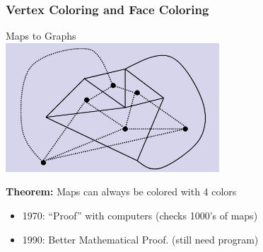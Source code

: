 \documentclass{beamer}
\begin{document}
\begin{frame}
  \frametitle{Vertex Coloring and Face Coloring}

  {\larger
    \begin{center}
      Maps to Graphs\\
      \includegraphics[width=0.6\textwidth]{../img/facecolor}
    \end{center}

    {\bf Theorem:} Maps can always be colored with 4 colors
    \begin{itemize}
    \item 1970: ``Proof'' with computers (checks 1000's of maps)
    \item 1990: Better Mathematical Proof. (still need program)
    \end{itemize}

  }
\end{frame}
\end{document}
